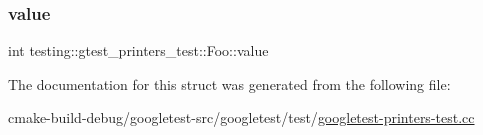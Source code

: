 \subsubsection{\texorpdfstring{value}{value}}
{\footnotesize\ttfamily int testing\+::gtest\+\_\+printers\+\_\+test\+::\+Foo\+::value}



The documentation for this struct was generated from the following file\+:\begin{DoxyCompactItemize}
\item 
cmake-\/build-\/debug/googletest-\/src/googletest/test/\mbox{\hyperlink{googletest-printers-test_8cc}{googletest-\/printers-\/test.\+cc}}\end{DoxyCompactItemize}
